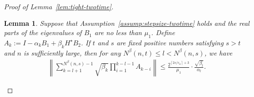 \documentclass[11pt]{article}
\theoremstyle{plain}
\newtheorem{lem}{Lemma}[section]
\theoremstyle{definition}
\def\mI{{\bm{I}}}
\def\OM{{\mathcal O}}
\def\mI{{I}}
\begin{document}
\begin{appendix}
\begin{proof}[Proof of Lemma~\ref{lem:tight-twotime}]
    \begin{lem}\label{lem:slow:stepsize-aux}
        Suppose that Assumption~\ref{assump:stepsize-twotime} holds and
        the real parts of the eigenvalues of $B_1$ are no less than $\mu_1$.
        Define $A_{k}:= \mI - \alpha_{k} B_1 + \beta_{k} H^\star B_2$.
        If $t$ and $s$ are fixed positive numbers satisfying $s>t$ and $n$ is sufficiently large,
        then for any $N^\beta(n,t) \le l < N^\beta(n, s)$, 
        we have
        \begin{align*}
            \left\| \sum_{k=l+1}^{N^\beta(n,s)-1} \sqrt{\beta_{k}} \prod_{i=1}^{k-l-1} A_{k-i}
            \right\|
            \le \frac{ 2^{ \left\lceil 2s/c_\alpha \right\rceil + 3} }{\mu_1} \cdot
            \frac{ \sqrt{\beta_{l}} }{ \alpha_{l} }.
        \end{align*}
    \end{lem}
    

\end{proof}
\end{appendix}
\end{document}
